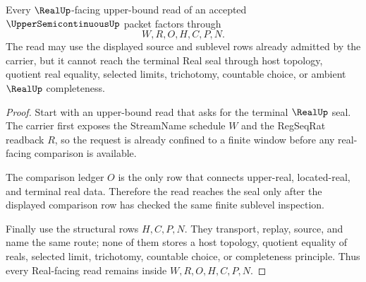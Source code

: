 \begin{theorem}
\label{thm:uppersemicontinuous-real-seal-nonescape}
Every $\RealUp$-facing upper-bound read of an accepted $\UpperSemicontinuousUp$ packet factors through
$$
W,R,O,H,C,P,N .
$$
The read may use the displayed source and sublevel rows already admitted by the carrier, but it cannot reach the terminal Real seal through host topology, quotient real equality, selected limits, trichotomy, countable choice, or ambient $\RealUp$ completeness.
\end{theorem}
\begin{proof}
Start with an upper-bound read that asks for the terminal $\RealUp$ seal. The carrier first exposes the StreamName schedule $W$ and the RegSeqRat readback $R$, so the request is already confined to a finite window before any real-facing comparison is available.

The comparison ledger $O$ is the only row that connects upper-real, located-real, and terminal real data. Therefore the read reaches the seal only after the displayed comparison row has checked the same finite sublevel inspection.

Finally use the structural rows $H,C,P,N$. They transport, replay, source, and name the same route; none of them stores a host topology, quotient equality of reals, selected limit, trichotomy, countable choice, or completeness principle. Thus every Real-facing read remains inside $W,R,O,H,C,P,N$.
\end{proof}


\begin{closurestatus}{\UpperSemicontinuousUp}
  \theoryclosure{\obligationClosure}
  \formalstatus{\unformalizedV}
\end{closurestatus}

